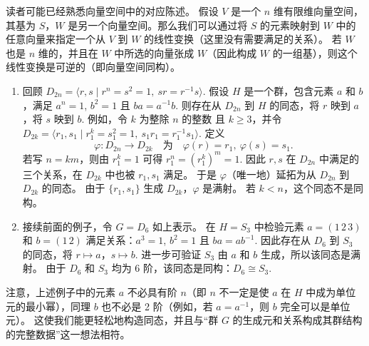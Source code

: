 读者可能已经熟悉向量空间中的对应陈述。
假设 \( V \) 是一个 \( n \) 维有限维向量空间，其基为 \( S \)，\( W \) 是另一个向量空间。那么我们可以通过将 \( S \) 的元素映射到 \( W \) 中的任意向量来指定一个从 \( V \) 到 \( W \) 的线性变换（这里没有需要满足的关系）。
若 \( W \) 也是 \( n \) 维的，并且在 \( W \) 中所选的向量张成 \( W \)（因此构成 \( W \) 的一组基），则这个线性变换是可逆的（即向量空间同构）。

\begin{example}
\begin{enumerate}[label=(\arabic*)]
\item 回顾 \( D_{2n} = \langle r, s \mid r^n = s^2 = 1,\ sr = r^{-1}s \rangle \). 
假设 \( H \) 是一个群，包含元素 \( a \) 和 \( b \)，满足 \( a^n = 1 \), \( b^2 = 1 \) 且 \( ba = a^{-1}b \). 
则存在从 \( D_{2n} \) 到 \( H \) 的同态，将 \( r \) 映到 \( a \)，将 \( s \) 映到 \( b \). 
例如，令 \( k \) 为整除 \( n \) 的整数 %
且 \( k \geq 3 \)，并令 \( D_{2k} = \langle r_1, s_1 \mid r_1^k = s_1^2 = 1,\ s_1r_1 = r_1^{-1}s_1 \rangle \). 定义
\[
\varphi : D_{2n} \to D_{2k} \quad \text{为} \quad \varphi(r) = r_1,\ \varphi(s) = s_1.
\]
若写 \( n = km \)，则由 \( r_1^k = 1 \) 可得 \( r_1^n = (r_1^k)^m = 1 \). 
因此 \( r, s \) 在 \( D_{2n} \) 中满足的三个关系，在 \( D_{2k} \) 中也被 \( r_1, s_1 \) 满足。
于是 \( \varphi \)（唯一地）延拓为从 \( D_{2n} \) 到 \( D_{2k} \) 的同态。
由于 \( \{r_1, s_1\} \) 生成 \( D_{2k} \)，\( \varphi \) 是满射。
若 \( k < n \)，这个同态不是同构。

\item 接续前面的例子，令 \( G = D_6 \) 如上表示。
在 \( H = S_3 \) 中检验元素 \( a = (1 \, 2 \, 3) \) 和 \( b = (1 \, 2) \) 满足关系：\( a^3 = 1 \), \( b^2 = 1 \) 且 \( ba = ab^{-1} \). 
因此存在从 \( D_6 \) 到 \( S_3 \) 的同态，将 \( r \mapsto a \)，\( s \mapsto b \). 
进一步可验证 \( S_3 \) 由 \( a \) 和 \( b \) 生成，所以该同态是满射。
由于 \( D_6 \) 和 \( S_3 \) 均为 6 阶，该同态是同构：\( D_6 \cong S_3 \).

\end{enumerate}

\end{example}
注意，上述例子中的元素 \( a \) 不必具有阶 \( n \)（即 \( n \) 不一定是使 \( a \) 在 \( H \) 中成为单位元的最小幂），同理 \( b \) 也不必是 2 阶（例如，若 \( a = a^{-1} \)，则 \( b \) 完全可以是单位元）。
这使我们能更轻松地构造同态，并且与“群 \( G \) 的生成元和关系构成其群结构的完整数据”这一想法相符。

